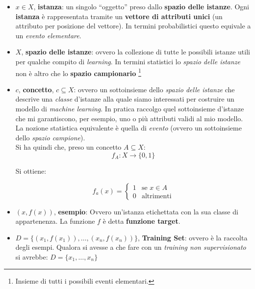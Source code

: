 \begin{shaded}
  \begin{itemize}
  
    \item $x\in X$, \textbf{istanza}: un singolo ``oggetto'' preso dallo
    \textbf{spazio delle istanze}. Ogni \textbf{istanza} è rappresentata tramite
    un \textbf{vettore di attributi unici} (un attributo per posizione del
    vettore). In termini probabilistici questo equivale a un \textit{evento elementare}.
    
    \item $X$, \textbf{spazio delle istanze}: ovvero la collezione di tutte le
    possibili istanze utili per qualche compito di \textit{learning}. 
    In termini statistici lo \textit{spazio delle istanze} non è altro che lo 
    \textbf{spazio campionario} \footnote{Insieme di tutti i possibili eventi elementari.}
    
    \item $c$, \textbf{concetto}, $c\subseteq X$: ovvero un sottoinsieme dello \textit{spazio delle istanze} che descrive una \textit{classe} d'istanze alla quale siamo interessati per costruire un modello di \textit{machine learning}. In pratica raccolgo quel sottoinsieme d'istanze che mi garantiscono, per esempio, uno o più attributi validi al mio modello. La nozione statistica equivalente è quella di \textit{evento} (ovvero un sottoinsieme dello \textit{spazio campione}).\\ 
    Si ha quindi che, preso un concetto $A\subseteq X$:
    \[f_A:X\to\{0, 1\}\]
    
    Si ottiene: 
    
    \[f_a(x)=
      \begin{cases}
        1& \mbox{se } x\in A\\
        0& \mbox{altrimenti}
      \end{cases}
    \]
    
    \item $(x, f(x))$, \textbf{esempio}: Ovvero un'istanza etichettata con la sua classe di appartenenza. La funzione $f$ è detta \textbf{funzione target}.
    
    \item $D=\{(x_1, f(x_1)),\ldots,(x_n, f(x_n))\}$, \textbf{Training Set}:
    ovvero è la raccolta degli esempi. Qualora si avesse a che fare con un \textit{training non supervisionato} si avrebbe:
    $D=\{x_1,\ldots, x_n\}$
    

\end{itemize}
\end{shaded}
